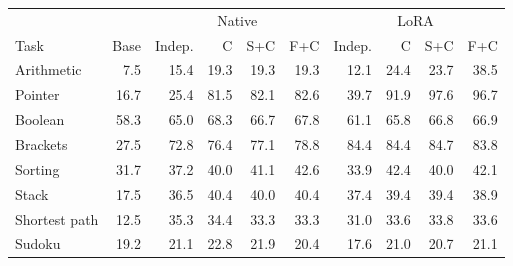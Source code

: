 \begin{tabular}{@{}lrrrrrrrrr@{}}
\toprule
 & & \multicolumn{4}{c}{Native} & \multicolumn{4}{c}{LoRA}\\
Task & Base & Indep. & C & S+C & F+C & Indep. & C & S+C & F+C\\
\midrule
Arithmetic & 7.5 & 15.4 & 19.3 & 19.3 & 19.3 & 12.1 & 24.4 & 23.7 & 38.5\\
Pointer & 16.7 & 25.4 & 81.5 & 82.1 & 82.6 & 39.7 & 91.9 & 97.6 & 96.7\\
Boolean & 58.3 & 65.0 & 68.3 & 66.7 & 67.8 & 61.1 & 65.8 & 66.8 & 66.9\\
Brackets & 27.5 & 72.8 & 76.4 & 77.1 & 78.8 & 84.4 & 84.4 & 84.7 & 83.8\\
Sorting & 31.7 & 37.2 & 40.0 & 41.1 & 42.6 & 33.9 & 42.4 & 40.0 & 42.1\\
Stack & 17.5 & 36.5 & 40.4 & 40.0 & 40.4 & 37.4 & 39.4 & 39.4 & 38.9\\
Shortest path & 12.5 & 35.3 & 34.4 & 33.3 & 33.3 & 31.0 & 33.6 & 33.8 & 33.6\\
Sudoku & 19.2 & 21.1 & 22.8 & 21.9 & 20.4 & 17.6 & 21.0 & 20.7 & 21.1\\
\bottomrule
\end{tabular}
